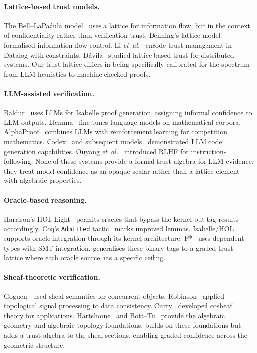 \documentclass[11pt]{article}
\begin{document}
\paragraph{Lattice-based trust models.}
The Bell--LaPadula model~\cite{bell1973secure} uses a lattice for
information flow, but in the context of confidentiality rather than
verification trust.  Denning's lattice model~\cite{denning1976lattice}
formalised information flow control.  Li \emph{et~al.}~\cite{li2003datalog}
encode trust management in Datalog with constraints.  D{\'a}vila~\cite{davila2023lattice}
studied lattice-based trust for distributed systems.  Our trust lattice
differs in being specifically calibrated for the spectrum from LLM heuristics
to machine-checked proofs.

\paragraph{LLM-assisted verification.}
Baldur~\cite{first2023baldur} uses LLMs for Isabelle proof generation,
assigning informal confidence to LLM outputs.
Llemma~\cite{azerbayev2024llemma} fine-tunes language models on mathematical
corpora.  AlphaProof~\cite{deepmind2024alphaproof} combines LLMs with
reinforcement learning for competition mathematics.  Codex~\cite{chen2021evaluating}
and subsequent models~\cite{austin2021program} demonstrated LLM code generation
capabilities.  Ouyang \emph{et~al.}~\cite{ouyang2022training} introduced RLHF
for instruction-following.  None of these systems
provide a formal trust algebra for LLM evidence; they treat model confidence
as an opaque scalar rather than a lattice element with algebraic properties.

\paragraph{Oracle-based reasoning.}
Harrison's HOL Light~\cite{harrison1996hol} permits oracles that bypass
the kernel but tag results accordingly.  Coq's \texttt{Admitted}
tactic~\cite{bertot2004interactive} marks unproved lemmas.
Isabelle/HOL~\cite{nipkow2002isabelle} supports oracle integration through
its kernel architecture.  F*~\cite{swamy2016dependent} uses dependent types
with SMT integration.  \JuGeo{} generalises these binary tags to a graded
trust lattice where each oracle source has a specific ceiling.

\paragraph{Sheaf-theoretic verification.}
Goguen~\cite{goguen1992sheaves} used sheaf semantics for concurrent objects.
Robinson~\cite{robinson2014topological} applied topological signal processing
to data consistency.  Curry~\cite{curry2014sheaves} developed cosheaf theory
for applications.  Hartshorne~\cite{hartshorne1977algebraic} and
Bott--Tu~\cite{bott1982differential} provide the algebraic geometry and
algebraic topology foundations.  \JuGeo{} builds on these foundations but adds
a trust algebra to the sheaf sections, enabling graded confidence across
the geometric structure.
\end{document}
